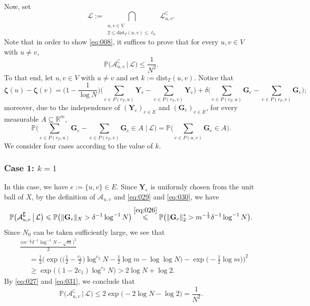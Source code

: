 \documentclass[11pt,leqno]{amsart}
\theoremstyle{remark}
\theoremstyle{plain}
\begin{document}
Now, set
\[ \mathcal{L} :=
\bigcap_{\substack{ u,v\in V \\ 2\leqslant\mathrm{dist}_T(u,v)\leqslant\ell_0 }} \mathcal{L}_{u,v}^{\complement}. \]
Note that in order to show \eqref{eq:008}, it suffices to prove that for every $u,v\in V$ with $u\neq v$,
\begin{equation}\label{eq:028}
\mathbb{P}\big(\mathcal{A}_{u,v}^{\complement}\,\big|\,\mathcal{L}\big)\leqslant\frac{1}{N^2}.
\end{equation}
To that end, let $u,v\in V$ with $u\neq v$ and set $k:= \mathrm{dist}_T(u,v)$.
Notice that
\begin{equation}\label{eq:029}
  \boldsymbol{\zeta}(u)- \boldsymbol{\zeta}(v)
  = \Big( 1-\frac{1}{\log N} \Big) \Big(\sum_{e\in P(r_T, u)} \mathbf{Y}_e - \sum_{e\in P(r_T, v)} \mathbf{Y}_e\Big) +\delta \Big(\sum_{e\in P(r_T, u)} \mathbf{G}_e - \sum_{e\in P(r_T, v)} \mathbf{G}_e\Big);
\end{equation}
moreover, due to the independence of $(\mathbf{Y}_e)_{e\in E}$ and $(\mathbf{G}_e)_{e\in E}$, for every measurable
$A\subseteq \mathbb{R}^m$,
\begin{equation}\label{eq:030}
\mathbb{P}\Big(\sum_{e\in P(r_T, u)} \mathbf{G}_e - \sum_{e\in P(r_T, v)} \mathbf{G}_e \in A\; \Big|\, \mathcal{L}\Big)
  = \mathbb{P} \Big(\sum_{e\in P(u, v)} \mathbf{G}_e \in A\Big).
\end{equation}
We consider four cases according to the value of $k$.

\subsubsection*{Case 1: $k=1$}

In this case, we have $e:=\{u,v\}\in E$. Since $\mathbf{Y}_e$ is uniformly chosen from the unit ball of $X$,
by the definition of $\mathcal{A}_{u,v}$ and \eqref{eq:029} and \eqref{eq:030}, we have
\begin{equation} \label{eq:031}
\mathbb{P}\big(\mathcal{A}_{u,v}^{\complement}\, \big|\, \mathcal{L}\big) \leqslant
\mathbb{P}\big( \|\mathbf{G}_e\|_X> \delta^{-1} \log^{-1}N\big) \stackrel{\eqref{eq:026}}{\leqslant}
\mathbb{P}\big(\|\mathbf{G}_e\|_2^*> m^{-\frac{1}{2}}\delta^{-1} \log^{-1}N\big).
\end{equation}
Since $N_0$ can be taken sufficiently large, we see that
\begin{align*}
& \frac{\big( m^{-\frac{1}{2}}\delta^{-1}\log^{-1}N -\sqrt{m}\big)^2}{2} \\
& \ \ \ \ \ \ =
\frac{1}{2} \Big(\exp\Big( \Big(\frac{1}{2}-\frac{c_1}{2}\Big) \log^{c_2}N -\frac{1}{2} \log m - \log\log N\Big) -
\exp\Big(-\frac{1}{2}\log m\Big)\Big)^2 \\
& \ \ \ \ \ \
\geqslant \exp\big( (1-2c_1)\log^{c_2}N\big) > 2\log N+\log2.
\end{align*}
By \eqref{eq:027} and \eqref{eq:031}, we conclude that
\[ \mathbb{P}\big(\mathcal{A}_{u,v}^{\complement}\,\big|\,\mathcal{L}\big)
\leqslant 2\exp\big(-2\log N-\log2\big) = \frac{1}{N^2}. \]
\end{document}
